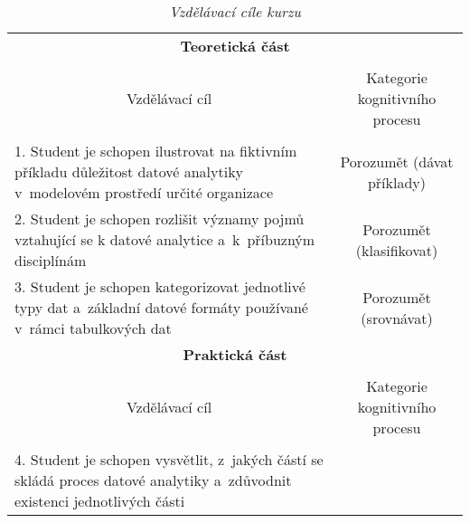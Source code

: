 

\begin{table}[htbp]

\renewcommand\thetable{1}

\caption{\textit{Vzdělávací cíle kurzu}}\label{tab-cile}

\footnotesize

{

\begin{tabularx}{\linewidth}{p{9cm}c}

\toprule

\multicolumn{2}{c}{\textbf{Teoretická část}}

\tabularnewline
\\

\multicolumn{1}{c}{Vzdělávací cíl} & Kategorie kognitivního procesu 

\tabularnewline
\\
\midrule

1. Student je schopen ilustrovat na fiktivním příkladu důležitost datové analytiky v~modelovém prostředí určité organizace\label{1-cil}

&

Porozumět (dávat příklady)

\\
\midrule

2. Student je schopen rozlišit významy pojmů vztahující se k datové analytice a~k~příbuzným disciplínám\label{2-cil}

&

Porozumět (klasifikovat)

\\

\midrule

3. Student je schopen kategorizovat jednotlivé typy dat a~základní datové formáty používané v~rámci tabulkových dat\label{3-cil}

&

Porozumět (srovnávat)

\\
\toprule

\multicolumn{2}{c}{\textbf{Praktická část}}

\\

\tabularnewline

\multicolumn{1}{c}{Vzdělávací cíl} & Kategorie kognitivního procesu 

\tabularnewline
\\
\midrule

4. Student je schopen vysvětlit, z~jakých částí se skládá proces datové analytiky a~zdůvodnit existenci jednotlivých části\label{4-cil}


\end{tabularx}}
\end{table}
